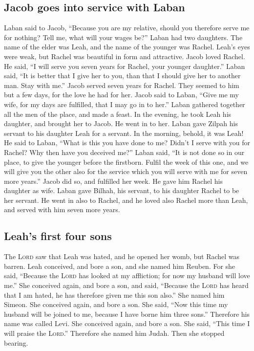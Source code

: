 \hypertarget{jacob-goes-into-service-with-laban}{%
\subsection{Jacob goes into service with
Laban}\label{jacob-goes-into-service-with-laban}}

 Laban said to Jacob, ``Because you are my relative,
should you therefore serve me for nothing? Tell me, what will your wages
be?''  Laban had two daughters. The name of the elder was
Leah, and the name of the younger was Rachel.  Leah's
eyes were weak, but Rachel was beautiful in form and attractive.
 Jacob loved Rachel. He said, ``I will serve you seven
years for Rachel, your younger daughter.''  Laban said,
``It is better that I give her to you, than that I should give her to
another man. Stay with me.''  Jacob served seven years
for Rachel. They seemed to him but a few days, for the love he had for
her.  Jacob said to Laban, ``Give me my wife, for my days
are fulfilled, that I may go in to her.''  Laban gathered
together all the men of the place, and made a feast.  In
the evening, he took Leah his daughter, and brought her to Jacob. He
went in to her.  Laban gave Zilpah his servant to his
daughter Leah for a servant.  In the morning, behold, it
was Leah! He said to Laban, ``What is this you have done to me? Didn't I
serve with you for Rachel? Why then have you deceived me?''
 Laban said, ``It is not done so in our place, to give
the younger before the firstborn.  Fulfil the week of
this one, and we will give you the other also for the service which you
will serve with me for seven more years.''  Jacob did so,
and fulfilled her week. He gave him Rachel his daughter as wife.
 Laban gave Bilhah, his servant, to his daughter Rachel
to be her servant.  He went in also to Rachel, and he
loved also Rachel more than Leah, and served with him seven more years.

\hypertarget{leahs-first-four-sons}{%
\subsection{Leah's first four sons}\label{leahs-first-four-sons}}

 The \textsc{Lord} saw that Leah was hated, and he opened
her womb, but Rachel was barren.  Leah conceived, and
bore a son, and she named him Reuben. For she said, ``Because the
\textsc{Lord} has looked at my affliction; for now my husband will love
me.''  She conceived again, and bore a son, and said,
``Because the \textsc{Lord} has heard that I am hated, he has therefore
given me this son also.'' She named him Simeon.  She
conceived again, and bore a son. She said, ``Now this time my husband
will be joined to me, because I have borne him three sons.'' Therefore
his name was called Levi.  She conceived again, and bore
a son. She said, ``This time I will praise the \textsc{Lord}.''
Therefore she named him Judah. Then she stopped bearing.

